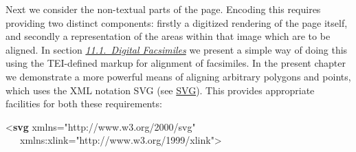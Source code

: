 Next we consider the non-textual parts of the page. Encoding this requires providing two distinct components: firstly a digitized rendering of the page itself, and secondly a representation of the areas within that image which are to be aligned. In section \textit{\hyperref[PHFAX]{11.1.\ Digital Facsimiles}} we present a simple way of doing this using the TEI-defined markup for alignment of facsimiles. In the present chapter we demonstrate a more powerful means of aligning arbitrary polygons and points, which uses the XML notation SVG (see \hyperref[SVG-11]{SVG}). This provides appropriate facilities for both these requirements: \par\bgroup\exampleFont \begin{shaded}\noindent\mbox{}{<\textbf{svg} xmlns="http://www.w3.org/2000/svg"\mbox{}\newline 
   xmlns:xlink="http://www.w3.org/1999/xlink">}\mbox{}\newline 
{}\mbox{}\newline 
{}\mbox{}\newline 
{}\mbox{}\newline 

\end{shaded}
